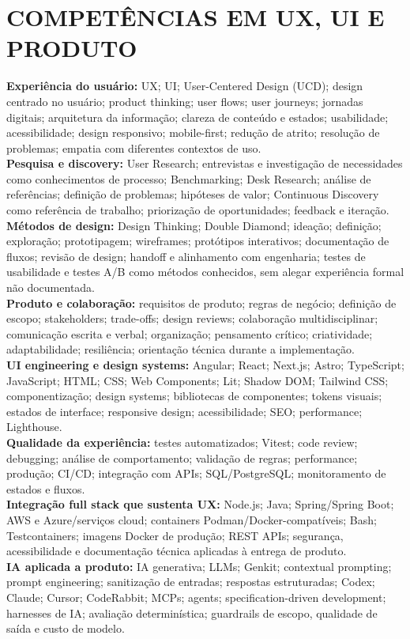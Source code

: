 \documentclass[10pt,a4paper]{article}
\begin{document}
\section*{COMPETÊNCIAS EM UX, UI E PRODUTO}
\footnotesize
\textbf{Experiência do usuário:} UX; UI; User-Centered Design (UCD); design centrado no usuário; product thinking; user flows; user journeys; jornadas digitais; arquitetura da informação; clareza de conteúdo e estados; usabilidade; acessibilidade; design responsivo; mobile-first; redução de atrito; resolução de problemas; empatia com diferentes contextos de uso.\\
\textbf{Pesquisa e discovery:} User Research; entrevistas e investigação de necessidades como conhecimentos de processo; Benchmarking; Desk Research; análise de referências; definição de problemas; hipóteses de valor; Continuous Discovery como referência de trabalho; priorização de oportunidades; feedback e iteração.\\
\textbf{Métodos de design:} Design Thinking; Double Diamond; ideação; definição; exploração; prototipagem; wireframes; protótipos interativos; documentação de fluxos; revisão de design; handoff e alinhamento com engenharia; testes de usabilidade e testes A/B como métodos conhecidos, sem alegar experiência formal não documentada.\\
\textbf{Produto e colaboração:} requisitos de produto; regras de negócio; definição de escopo; stakeholders; trade-offs; design reviews; colaboração multidisciplinar; comunicação escrita e verbal; organização; pensamento crítico; criatividade; adaptabilidade; resiliência; orientação técnica durante a implementação.\\
\textbf{UI engineering e design systems:} Angular; React; Next.js; Astro; TypeScript; JavaScript; HTML; CSS; Web Components; Lit; Shadow DOM; Tailwind CSS; componentização; design systems; bibliotecas de componentes; tokens visuais; estados de interface; responsive design; acessibilidade; SEO; performance; Lighthouse.\\
\textbf{Qualidade da experiência:} testes automatizados; Vitest; code review; debugging; análise de comportamento; validação de regras; performance; produção; CI/CD; integração com APIs; SQL/PostgreSQL; monitoramento de estados e fluxos.\\
\textbf{Integração full stack que sustenta UX:} Node.js; Java; Spring/Spring Boot; AWS e Azure/serviços cloud; containers Podman/Docker-compatíveis; Bash; Testcontainers; imagens Docker de produção; REST APIs; segurança, acessibilidade e documentação técnica aplicadas à entrega de produto.\\
\textbf{IA aplicada a produto:} IA generativa; LLMs; Genkit; contextual prompting; prompt engineering; sanitização de entradas; respostas estruturadas; Codex; Claude; Cursor; CodeRabbit; MCPs; agents; specification-driven development; harnesses de IA; avaliação determinística; guardrails de escopo, qualidade de saída e custo de modelo.
\end{document}
